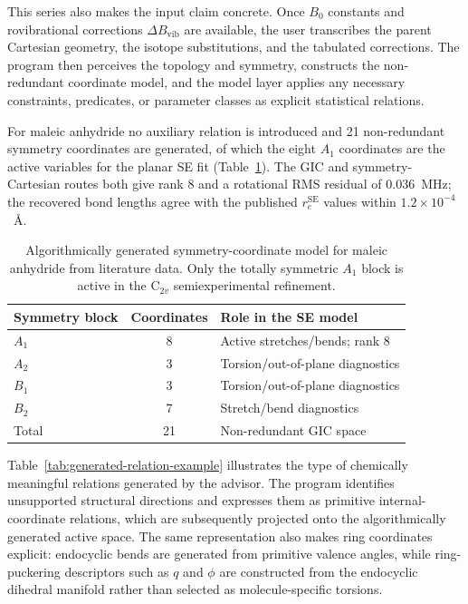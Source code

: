\documentclass[aip,jcp,reprint,longbibliography,floatfix]{revtex4-2}
\begin{document}
This series also makes the input claim concrete. Once $B_0$ constants and
rovibrational corrections $\Delta B_\mathrm{vib}$ are available, the
user transcribes the parent Cartesian geometry, the isotope
substitutions, and the tabulated corrections. The program then perceives the
topology and symmetry, constructs the non-redundant coordinate model, and
the model layer applies any necessary constraints, predicates, or parameter
classes as explicit statistical relations.

For maleic anhydride no auxiliary relation is introduced and 21
non-redundant symmetry coordinates are generated, of which the eight $A_1$ coordinates are
the active variables for the planar SE fit (Table~\ref{tab:maleic-symmetry-gics}).
The GIC and symmetry-Cartesian routes both give rank 8 and a rotational RMS
residual of 0.036~MHz; the recovered bond lengths agree with the published
$r_e^\mathrm{SE}$ values within $1.2\times10^{-4}$~\AA.

\begin{table}[t]
\caption{Algorithmically generated symmetry-coordinate model for maleic
anhydride from literature data. Only the totally symmetric $A_1$ block is
active in the C$_{2v}$ semiexperimental refinement.}
\label{tab:maleic-symmetry-gics}
\scriptsize
\setlength{\tabcolsep}{4pt}
\begin{tabular}{@{}lcl@{}}
\toprule
Symmetry block & Coordinates & Role in the SE model \\
\midrule
$A_1$ & 8 & Active stretches/bends; rank 8 \\
$A_2$ & 3 & Torsion/out-of-plane diagnostics \\
$B_1$ & 3 & Torsion/out-of-plane diagnostics \\
$B_2$ & 7 & Stretch/bend diagnostics \\
\midrule
Total & 21 & Non-redundant GIC space \\
\bottomrule
\end{tabular}
\end{table}

Table~\ref{tab:generated-relation-example} illustrates the type of chemically
meaningful relations generated by the advisor. The program
identifies unsupported structural directions and expresses them as primitive
internal-coordinate relations, which are subsequently projected onto the
algorithmically generated active space. The same representation also makes
ring coordinates explicit: endocyclic bends are generated from primitive
valence angles, while ring-puckering descriptors such as $q$ and $\phi$ are
constructed from the endocyclic dihedral manifold rather than selected as
molecule-specific torsions.
\end{document}
